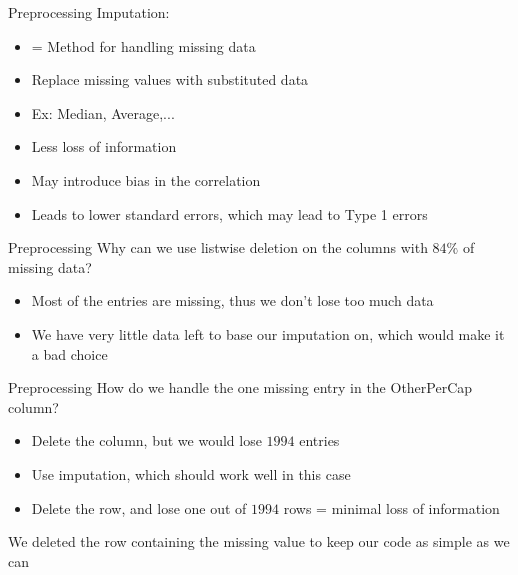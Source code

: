 \documentclass{beamer}
\begin{document}
	\begin{frame}{Preprocessing}
		Imputation:
		\begin{itemize}
			\item = Method for handling missing data
			\item Replace missing values with substituted data
			\item Ex: Median, Average,...
			\item Less loss of information
			\item May introduce bias in the correlation
			\item Leads to lower standard errors, which may lead to Type 1 errors
		\end{itemize}
	\end{frame}

	\begin{frame}{Preprocessing}
		Why can we use listwise deletion on the columns with $84\%$ of missing data?
		\begin{itemize}
			\item Most of the entries are missing, thus we don't lose too much data
			\item We have very little data left to base our imputation on, which would make it a bad choice
		\end{itemize}
	\end{frame}

	\begin{frame}{Preprocessing}
		How do we handle the one missing entry in the OtherPerCap column?
		\begin{itemize}
			\item Delete the column, but we would lose $1994$ entries
			\item Use imputation, which should work well in this case
			\item Delete the row, and lose one out of $1994$ rows = minimal loss of information
		\end{itemize}
		We deleted the row containing the missing value to keep our code as simple as we can
	\end{frame}
	
\end{document}
